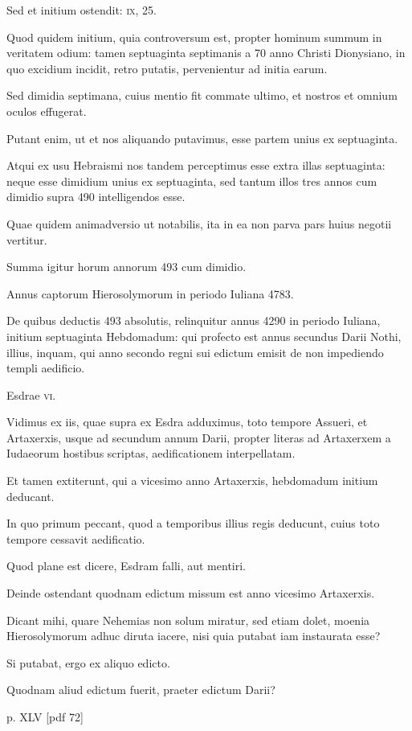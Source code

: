 \begin{parnumbers}
Sed et initium ostendit: \textsc{ix}, 25.

Quod quidem initium,
quia controversum est, propter hominum summum in veritatem
odium: tamen septuaginta septimanis a 70 anno Christi
Dionysiano, in quo excidium incidit, retro putatis, pervenientur
ad initia earum.

Sed dimidia septimana, cuius mentio fit commate
ultimo, et nostros et omnium oculos effugerat.

Putant enim,
ut et nos aliquando putavimus, esse partem unius ex septuaginta.

Atqui ex usu Hebraismi nos tandem perceptimus esse extra illas septuaginta:
neque esse dimidium unius ex septuaginta, sed tantum
illos tres annos cum dimidio supra 490 intelligendos esse.

Quae
quidem animadversio ut notabilis, ita in ea non parva pars huius
negotii vertitur.

Summa igitur horum annorum 493 cum dimidio.

Annus captorum Hierosolymorum in periodo Iuliana 4783.

De quibus deductis 493 absolutis, relinquitur annus 4290 in periodo
Iuliana, initium septuaginta Hebdomadum: qui profecto
est annus secundus Darii Nothi, illius, inquam, qui anno secondo
regni sui edictum emisit de non impediendo templi aedificio.

Esdrae \textsc{vi}.

Vidimus ex iis, quae supra ex Esdra adduximus, toto tempore
Assueri, et Artaxerxis, usque ad secundum annum Darii, propter
literas ad Artaxerxem a Iudaeorum hostibus scriptas, aedificationem
interpellatam.

Et tamen extiterunt, qui a vicesimo anno
Artaxerxis, hebdomadum initium deducant.

In quo primum
peccant, quod a temporibus illius regis deducunt, cuius toto tempore
cessavit aedificatio.

Quod plane est dicere, Esdram falli, aut mentiri.

Deinde ostendant quodnam edictum missum est anno vicesimo
Artaxerxis.

Dicant mihi, quare Nehemias non solum miratur,
sed etiam dolet, moenia Hierosolymorum adhuc diruta iacere,
nisi quia putabat iam instaurata esse?

Si putabat, ergo ex
aliquo edicto.

Quodnam aliud edictum fuerit, praeter edictum
Darii?

\clearpage
p. XLV [pdf 72]


\end{parnumbers}
